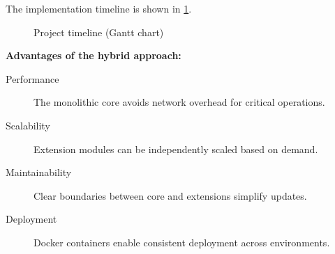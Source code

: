The implementation timeline is shown in \cref{fig:timeline}.

\begin{figure}[H]
    \centering
    \caption{Project timeline (Gantt chart)} \label{fig:timeline}
\end{figure}

\textbf{Advantages of the hybrid approach:}
\begin{description}
    \item[Performance] The monolithic core avoids network overhead for critical operations.
    \item[Scalability] Extension modules can be independently scaled based on demand.
    \item[Maintainability] Clear boundaries between core and extensions simplify updates.
    \item[Deployment] Docker containers enable consistent deployment across environments.
\end{description}

\clearpage
